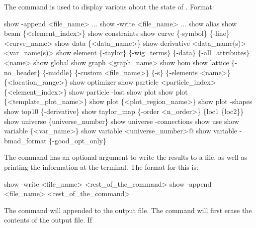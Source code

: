 {{The  command is used to display various about the state of \tao. 
Format:
\begin{example}
  show -append <file_name> ...
  show -write <file_name> ...
  show alias
  show beam \{<element_index>\}
  show constraints
  show curve \{-symbol\} \{-line\} <curve_name> 
  show data \{<data_name>\} 
  show derivative <data_name(s)> <var_name(s)>
  show element \{-taylor\} \{-wig_terms\} \{-data\} \{-all_attributes\} <name>
  show global
  show graph <graph_name>
  show hom
  show lattice \{-no_header\} \{-middle\} \{-custom <file_name>\} 
                            \{-s\} \{-elements <name>\} \{<location_range>\}
  show optimizer
  show particle <particle_index> \{<element_index>\}
  show particle -lost
  show plot
  show plot \{<template_plot_name>\}
  show plot \{<plot_region_name>\}
  show plot -shapes
  show top10 \{-derivative\}
  show taylor_map \{-order <n_order>\} \{loc1 \{loc2\}\}
  show universe \{universe_number\}
  show universe -connections
  show use
  show variable \{<var_name>\}
  show variable <universe_number>@
  show variable -bmad_format \{-good_opt_only\}
\end{example}

\vskip 0.2in 
The  command has an optional argument to write the results to a file.
as well as printing the information at the terminal. The format for this is:
\begin{example}
  show -write <file_name> <rest_of_the_command>
  show -append <file_name> <rest_of_the_command>
\end{example}
The  command will appended to the output file. The
 command will first erase the contents of the output
file. If \vn{global%
digit number is substituted for the \vn{*}. The value of the number
starts at \vn{001} and increases by 1 each time \vn{show -write} is
used.
Example:
\begin{example}
  show -write orb.dat orbit    ! Write orbit data to the file "orb.dat".
\end{example}



\begin{description}

\item[show alias] \Newline
Shows a list of defined aliases. See the \vn{alias} command for more
details.


\end{description}}}}
